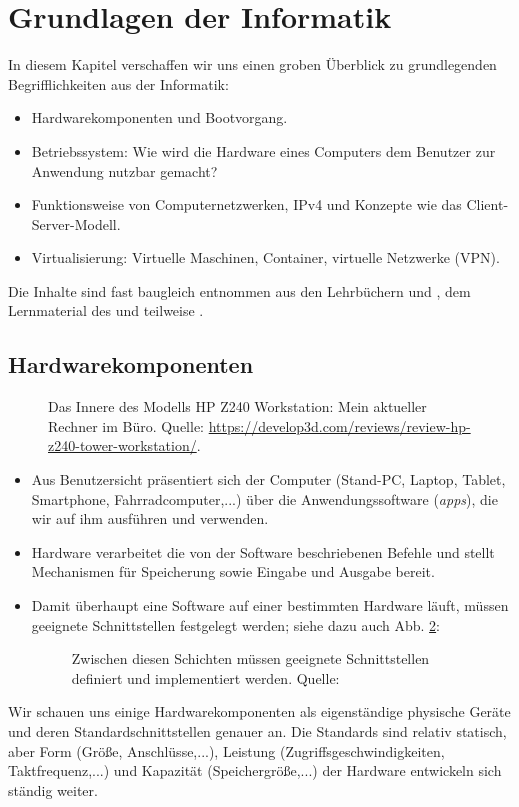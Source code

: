 \section{Grundlagen der Informatik}
In diesem Kapitel verschaffen wir uns einen groben Überblick zu grundlegenden Begrifflichkeiten aus der Informatik:
\begin{itemize}
	\item Hardwarekomponenten und Bootvorgang.
	\item Betriebssystem:  Wie wird die Hardware eines Computers dem Benutzer zur Anwendung nutzbar gemacht?
	\item Funktionsweise von Computernetzwerken, IPv4 und Konzepte wie das Client-Server-Modell.
	\item Virtualisierung: Virtuelle Maschinen, Container, virtuelle Netzwerke (VPN).
\end{itemize}
Die Inhalte sind fast baugleich entnommen aus den Lehrbüchern \cite{gumm3} und \cite{gumm2}, dem Lernmaterial des  und teilweise .

%
%
%
\subsection{Hardwarekomponenten}
\begin{figure}[h!]
	\centering
	\caption[HP Z240 Workstation]{
	Das Innere des Modells HP Z240 Workstation: Mein aktueller Rechner im Büro. Quelle: \url{https://develop3d.com/reviews/review-hp-z240-tower-workstation/}.}
	\label{fig:hp-z240}
\end{figure}
\begin{itemize}
	\item Aus Benutzersicht präsentiert sich der Computer (Stand-PC, Laptop, Tablet, Smartphone, Fahrradcomputer,...) über die Anwendungssoftware (\textit{apps}), die wir auf ihm ausführen und verwenden.
	\item Hardware verarbeitet die von der Software beschriebenen Befehle und stellt Mechanismen für Speicherung sowie Eingabe und Ausgabe bereit.
	\item Damit überhaupt eine Software auf einer bestimmten Hardware läuft, müssen geeignete Schnittstellen festgelegt werden; siehe dazu auch Abb. \ref{fig:betriebssystem}:
	\begin{figure}[h!]
		\centering
		\caption[Schnittstellen]{Zwischen diesen Schichten müssen geeignete Schnittstellen definiert und implementiert werden. Quelle: \cite[Abb. 1.25]{gumm2}}
		\label{fig:betriebssystem}
	\end{figure}
\end{itemize}
%
Wir schauen uns einige Hardwarekomponenten als eigenständige physische Geräte und deren Standardschnittstellen genauer an. Die Standards sind relativ statisch, aber Form (Größe, Anschlüsse,...), Leistung (Zugriffsgeschwindigkeiten, Taktfrequenz,...) und Kapazität (Speichergröße,...) der Hardware entwickeln sich ständig weiter.

